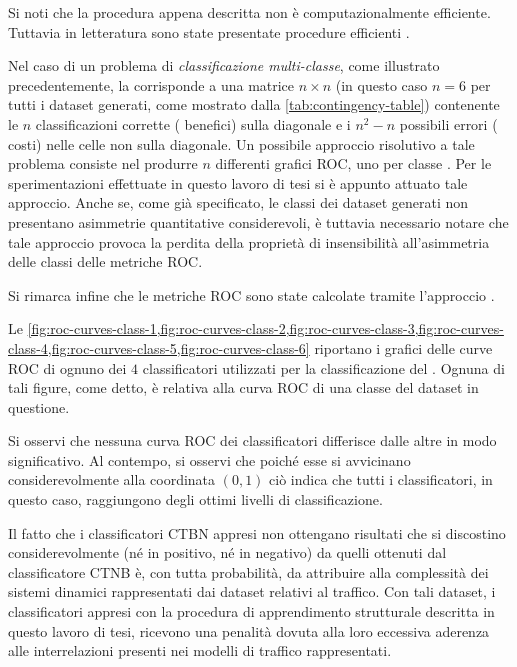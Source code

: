 Si noti che la procedura appena descritta non è computazionalmente efficiente. Tuttavia in letteratura sono state presentate procedure efficienti \citep[si veda][sezione $5$]{Fawcett2006}.

Nel caso di un problema di \emph{classificazione multi-classe}, come illustrato precedentemente, la \emph{} corrisponde a una matrice $n \times n$ (in questo caso $n=6$ per tutti i dataset generati, come mostrato dalla \vref{tab:contingency-table}) contenente le $n$ classificazioni corrette (\ie{} benefici) sulla diagonale e i $n^2 - n$ possibili errori (\ie{} costi) nelle celle non sulla diagonale. Un possibile approccio risolutivo a tale problema consiste nel produrre $n$ differenti grafici \acs{ROC}, uno per classe \citep{Fawcett2006}. Per le sperimentazioni effettuate in questo lavoro di tesi si è appunto attuato tale approccio. Anche se, come già specificato, le classi dei dataset generati non presentano asimmetrie quantitative considerevoli, è tuttavia necessario notare che tale approccio provoca la perdita della proprietà di insensibilità all'asimmetria delle classi delle metriche \acs{ROC}.

Si rimarca infine che le metriche \acs{ROC} sono state calcolate tramite l'approccio \emph{}.

Le \vref{fig:roc-curves-class-1,fig:roc-curves-class-2,fig:roc-curves-class-3,fig:roc-curves-class-4,fig:roc-curves-class-5,fig:roc-curves-class-6} riportano i grafici delle curve \acs{ROC} di ognuno dei $4$ classificatori utilizzati per la classificazione del . Ognuna di tali figure, come detto, è relativa alla curva \acs{ROC} di una classe del dataset in questione.

Si osservi che nessuna curva \acs{ROC} dei classificatori differisce dalle altre in modo significativo. Al contempo, si osservi che poiché esse si avvicinano considerevolmente alla coordinata $(0,1)$ ciò indica che tutti i classificatori, in questo caso, raggiungono degli ottimi livelli di classificazione.

Il fatto che i classificatori \acs{CTBN} appresi non ottengano risultati che si discostino considerevolmente (né in positivo, né in negativo) da quelli ottenuti dal classificatore \acs{CTNB} è, con tutta probabilità, da attribuire alla complessità dei sistemi dinamici rappresentati dai dataset relativi al traffico. Con tali dataset, i classificatori appresi con la procedura di apprendimento strutturale descritta in questo lavoro di tesi, ricevono una penalità dovuta alla loro eccessiva aderenza alle interrelazioni presenti nei modelli di traffico rappresentati.

